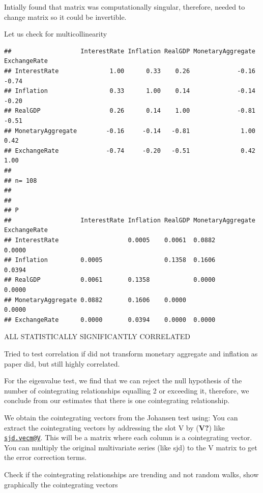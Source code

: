 \documentclass[11pt,preprint, authoryear]{elsarticle}
\numberwithin{equation}{section}
\numberwithin{figure}{section}
\numberwithin{table}{section}
\begin{document}
Intially found that matrix was computationally singular, therefore,
needed to change matrix so it could be invertible.

Let us check for multicollinearity

\begin{verbatim}
##                   InterestRate Inflation RealGDP MonetaryAggregate ExchangeRate
## InterestRate              1.00      0.33    0.26             -0.16        -0.74
## Inflation                 0.33      1.00    0.14             -0.14        -0.20
## RealGDP                   0.26      0.14    1.00             -0.81        -0.51
## MonetaryAggregate        -0.16     -0.14   -0.81              1.00         0.42
## ExchangeRate             -0.74     -0.20   -0.51              0.42         1.00
## 
## n= 108 
## 
## 
## P
##                   InterestRate Inflation RealGDP MonetaryAggregate ExchangeRate
## InterestRate                   0.0005    0.0061  0.0882            0.0000      
## Inflation         0.0005                 0.1358  0.1606            0.0394      
## RealGDP           0.0061       0.1358            0.0000            0.0000      
## MonetaryAggregate 0.0882       0.1606    0.0000                    0.0000      
## ExchangeRate      0.0000       0.0394    0.0000  0.0000
\end{verbatim}

ALL STATISTICALLY SIGNIFICANTLY CORRELATED

Tried to test correlation if did not transform monetary aggregate and
inflation as paper did, but still highly correlated.

For the eigenvalue test, we find that we can reject the null hypothesis
of the number of cointegrating relationships equalling 2 or exceeding
it, therefore, we conclude from our estimates that there is one
cointegrating relationship.

We obtain the cointegrating vectors from the Johansen test using: You
can extract the cointegrating vectors by addressing the slot V by
(\textbf{V?}) like \href{mailto:sjd.vecm@V}{\nolinkurl{sjd.vecm@V}}.
This will be a matrix where each column is a cointegrating vector. You
can multiply the original multivariate series (like sjd) to the V matrix
to get the error correction terms.

Check if the cointegrating relationships are trending and not random
walks, show graphically the cointegrating vectors
\end{document}
